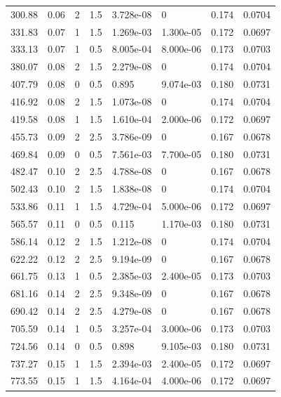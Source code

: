 \documentclass[preview]{standalone}
\begin{document}
{{\begin{tabular}{L{1.2cm}C{1.2cm} C{0.3cm}C{0.5cm} C{1.4cm}C{1.4cm} C{1.4cm}C{1.4cm}}
  300.88  &  0.06  & 2     & 1.5 &  3.728e-08  & 0  & 0.174 &  0.0704   \\ 
  331.83  &  0.07  & 1     & 1.5 &  1.269e-03  & 1.300e-05  & 0.172 &  0.0697   \\ 
  333.13  &  0.07  & 1     & 0.5 &  8.005e-04  & 8.000e-06  & 0.173 &  0.0703   \\ 
  380.07  &  0.08  & 2     & 1.5 &  2.279e-08  & 0  & 0.174 &  0.0704   \\ 
  407.79  &  0.08  & 0     & 0.5 &  0.895  & 9.074e-03  & 0.180 &  0.0731   \\ 
  416.92  &  0.08  & 2     & 1.5 &  1.073e-08  & 0  & 0.174 &  0.0704   \\ 
  419.58  &  0.08  & 1     & 1.5 &  1.610e-04  & 2.000e-06  & 0.172 &  0.0697   \\ 
  455.73  &  0.09  & 2     & 2.5 &  3.786e-09  & 0  & 0.167 &  0.0678   \\ 
  469.84  &  0.09  & 0     & 0.5 &  7.561e-03  & 7.700e-05  & 0.180 &  0.0731   \\ 
  482.47  &  0.10  & 2     & 2.5 &  4.788e-08  & 0  & 0.167 &  0.0678   \\ 
  502.43  &  0.10  & 2     & 1.5 &  1.838e-08  & 0  & 0.174 &  0.0704   \\ 
  533.86  &  0.11  & 1     & 1.5 &  4.729e-04  & 5.000e-06  & 0.172 &  0.0697   \\ 
  565.57  &  0.11  & 0     & 0.5 &  0.115  & 1.170e-03  & 0.180 &  0.0731   \\ 
  586.14  &  0.12  & 2     & 1.5 &  1.212e-08  & 0  & 0.174 &  0.0704   \\ 
  622.22  &  0.12  & 2     & 2.5 &  9.194e-09  & 0  & 0.167 &  0.0678   \\ 
  661.75  &  0.13  & 1     & 0.5 &  2.385e-03  & 2.400e-05  & 0.173 &  0.0703   \\ 
  681.16  &  0.14  & 2     & 2.5 &  9.348e-09  & 0  & 0.167 &  0.0678   \\ 
  690.42  &  0.14  & 2     & 2.5 &  4.279e-08  & 0  & 0.167 &  0.0678   \\ 
  705.59  &  0.14  & 1     & 0.5 &  3.257e-04  & 3.000e-06  & 0.173 &  0.0703   \\ 
  724.56  &  0.14  & 0     & 0.5 &  0.898  & 9.105e-03  & 0.180 &  0.0731   \\ 
  737.27  &  0.15  & 1     & 1.5 &  2.394e-03  & 2.400e-05  & 0.172 &  0.0697   \\ 
  773.55  &  0.15  & 1     & 1.5 &  4.164e-04  & 4.000e-06  & 0.172 &  0.0697   \\ 

\end{tabular}}}
\end{document}

